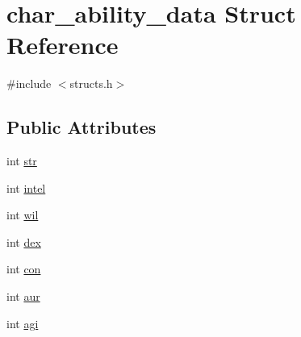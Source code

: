 \hypertarget{structchar__ability__data}{\section{char\-\_\-ability\-\_\-data Struct Reference}
\label{structchar__ability__data}
}


{\ttfamily \#include $<$structs.\-h$>$}

\subsection*{Public Attributes}
\begin{DoxyCompactItemize}
\item 
int \hyperlink{structchar__ability__data_a03590f60ecee188342000a9c2480863d}{str}
\item 
int \hyperlink{structchar__ability__data_af63e4fce63b64c461c265e2017bfd54c}{intel}
\item 
int \hyperlink{structchar__ability__data_a5a723a48b64cefe5b478ff8bbd20e61f}{wil}
\item 
int \hyperlink{structchar__ability__data_aa31c8cb270329610e5b8ccd5007b1836}{dex}
\item 
int \hyperlink{structchar__ability__data_a5b45e5f5def4987bdb429d9c9da41068}{con}
\item 
int \hyperlink{structchar__ability__data_aef296557583ee057d7c2a80c1e005319}{aur}
\item 
int \hyperlink{structchar__ability__data_a42ade1d78f01ef212d6e652c60a0b9a8}{agi}
\end{DoxyCompactItemize}


